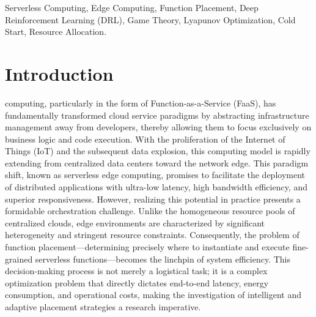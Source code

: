 \documentclass[lettersize,journal]{IEEEtran}
\begin{document}
\begin{IEEEkeywords}
Serverless Computing, Edge Computing, Function Placement, Deep Reinforcement Learning (DRL), Game Theory, Lyapunov Optimization, Cold Start, Resource Allocation.
\end{IEEEkeywords}

\section{Introduction}
 computing, particularly in the form of Function-as-a-Service (FaaS), has fundamentally transformed cloud service paradigms by abstracting infrastructure management away from developers, thereby allowing them to focus exclusively on business logic and code execution. With the proliferation of the Internet of Things (IoT) and the subsequent data explosion, this computing model is rapidly extending from centralized data centers toward the network edge. \IEEEpubidadjcol This paradigm shift, known as serverless edge computing, promises to facilitate the deployment of distributed applications with ultra-low latency, high bandwidth efficiency, and superior responsiveness. However, realizing this potential in practice presents a formidable orchestration challenge. Unlike the homogeneous resource pools of centralized clouds, edge environments are characterized by significant heterogeneity and stringent resource constraints. Consequently, the problem of function placement—determining precisely where to instantiate and execute fine-grained serverless functions—becomes the linchpin of system efficiency. This decision-making process is not merely a logistical task; it is a complex optimization problem that directly dictates end-to-end latency, energy consumption, and operational costs, making the investigation of intelligent and adaptive placement strategies a research imperative.
\end{document}
